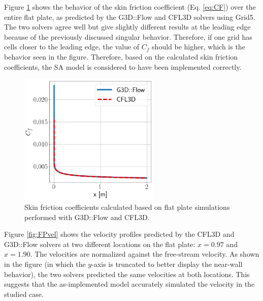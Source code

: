 Figure \ref{fig:FPCF} shows the behavior of the skin friction coefficient (Eq. \ref{eq:CF}) over the entire flat plate, as predicted by the G3D::Flow and CFL3D solvers using Grid5. The two solvers agree well but give slightly different results at the leading edge because of the previously discussed singular behavior. Therefore, if one grid has cells closer to the leading edge, the value of $C_f$ should be higher, which is the behavior seen in the figure. Therefore, based on the calculated skin friction coefficients, the SA model is considered to have been implemented correctly.
\begin{figure}[H]
  \centering
  \includegraphics[width=0.6\textwidth]{Figures/FPCF.png}
  \caption{Skin friction coefficients calculated based on flat plate simulations performed with G3D::Flow and CFL3D.} \label{fig:FPCF}
\end{figure}

Figure \ref{fig:FPvel} shows the velocity profiles predicted by the CFL3D and G3D::Flow solvers at two different locations on the flat plate: $x=0.97$ and $x=1.90$. The velocities are normalized against the free-stream velocity. As shown in the figure (in which the $y$-axis is truncated to better display the near-wall behavior), the two solvers predicted the same velocities at both locations. This suggests that the as-implemented model accurately simulated the velocity in the studied case.

